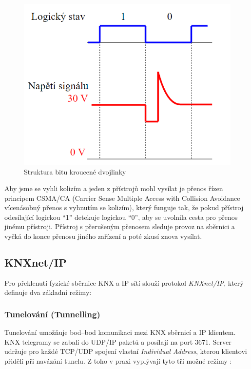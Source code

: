 \begin{figure}[!h]
  \begin{center}
    \includegraphics[scale=0.7]{obrazky/Struktura bitu.png}
  \end{center}
  \caption[Struktura bitu kroucené dvojlinky \cite{Celkovy prehled}]{Struktura bitu kroucené dvojlinky \cite{Celkovy prehled}}
  \label{fig:Struktura bitu kroucené dvojlinky}
\end{figure}

Aby jsme se vyhli kolizím a jeden z přístrojů mohl vysílat je přenos řízen principem CSMA/CA (Carrier Sense Multiple Access with Collision Avoidance vícenásobný přenos s vyhnutím se kolizím), který funguje tak, že pokud přístroj odesílající logickou “1” detekuje logickou “0”, aby se uvolnila cesta pro přenos jinému přístroji. Přístroj s přerušeným přenosem sleduje provoz na sběrnici a vyčká do konce přenosu jiného zařízení a poté zkusí znova vysílat. \cite{Celkovy prehled}
\subsection{KNXnet/IP}
\label{KNXnet/IP}

Pro překlenutí fyzické sběrnice KNX a IP sítí slouží protokol \emph{KNXnet/IP}, který definuje dva základní režimy:

\subsubsection{Tunelování (Tunnelling)}  
Tunelování umožňuje bod–bod komunikaci mezi KNX sběrnicí a IP klientem. KNX telegramy se zabalí do UDP/IP paketů a posílají na port 3671. Server udržuje pro každé TCP/UDP spojení vlastní \textit{Individual Address}, kterou klientovi přidělí při navázání tunelu. Z toho v praxi vyplývají tyto tři možné režimy \cite{KNXTunnel}:

